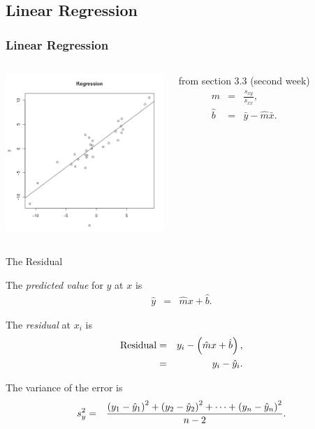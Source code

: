 \subsection{Linear Regression}

\begin{frame}
  \frametitle{Linear Regression}

    \begin{columns}

      \centerline{\includegraphics[width=6cm]{img/regressionGeneral}}

      
      from section 3.3 (second week)
      \begin{eqnarray*}
        \hat{m} & = & \frac{s_{xy}}{s_{xx}}, \\
        \hat{b} & = & \bar{y} - \hat{m} \bar{x}.
      \end{eqnarray*}

    \end{columns}

\end{frame}


\begin{frame}{The Residual}

  \begin{definition}
    The \textit{predicted value} for $y$ at $x$ is
    \begin{eqnarray*}
      \hat{y} & = & \hat{m} x + \hat{b}.
    \end{eqnarray*}

    The \textit{residual} at $x_i$ is 
    \begin{eqnarray*}
      \mathrm{Residual} & = & y_i - \left( \hat{m} x + \hat{b} \right), \\
      & = & y_i - \hat{y}_i.
    \end{eqnarray*}

  \end{definition}

  {

    \begin{definition}
      The variance of the error is 
      \begin{eqnarray*}
        s^2_y & = & \frac{\left( y_1 - \hat{y}_1\right)^2 + \left( y_2 - \hat{y}_2\right)^2 + \cdots + \left( y_n - \hat{y}_n\right)^2 }{n-2}.
      \end{eqnarray*}
    \end{definition}

  }
  
\end{frame}

